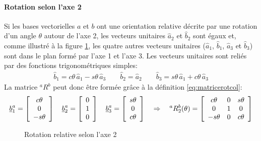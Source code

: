 \paragraph{Rotation selon l'axe 2}
%
Si les bases vectorielles $a$ et $b$ ont une orientation relative décrite par une rotation d'un angle $\theta$ autour de l'axe 2, les vecteurs unitaires $\hat{a}_2$ et $\hat{b}_2$ sont égaux et, comme illustré à la figure \ref{fig:r2vv}, les quatre autres vecteurs unitaires ($\hat{a}_1$, $\hat{b}_1$, $\hat{a}_3$ et $\hat{b}_3$) sont dans le plan formé par l'axe 1 et l'axe 3. Les vecteurs unitaires sont reliés par des fonctions trigonométriques simples: 
\begin{align}
\hat{b}_1 = c\theta \, \hat{a}_1 -s\theta \, \hat{a}_3 \quad\quad
\hat{b}_2 = \hat{a}_2 \quad\quad
\hat{b}_3 = s\theta \, \hat{a}_1 + c\theta \, \hat{a}_3
\label{eq:rot2vecuni}
\end{align}
La matrice $^aR^b$ peut donc être formée grâce à la définition \eqref{eq:matricerotcol}:
\begin{align}
\underline{b}_1^a = \left[ \begin{array}{c} c\theta \\ 0 \\ -s\theta  \end{array} \right] \quad
\underline{b}_2^a = \left[ \begin{array}{c} 0 \\ 1 \\ 0  \end{array} \right] \quad
\underline{b}_3^a = \left[ \begin{array}{c} s\theta \\ 0 \\ c\theta  \end{array} \right]
\quad \Rightarrow \quad
^aR^b_2(\theta) = \left[ \begin{array}{c c c}
	c\theta  & 0 & s\theta \\
	0        & 1 & 0 \\
	-s\theta & 0 & c\theta 
\end{array}  \right]
\label{eq:rot2theta}
\end{align}
%
\begin{figure}[H]
        \centering
				\hspace{+20pt}
        \caption{Rotation relative selon l'axe 2}
				\label{fig:r2vv}
\end{figure}
%


